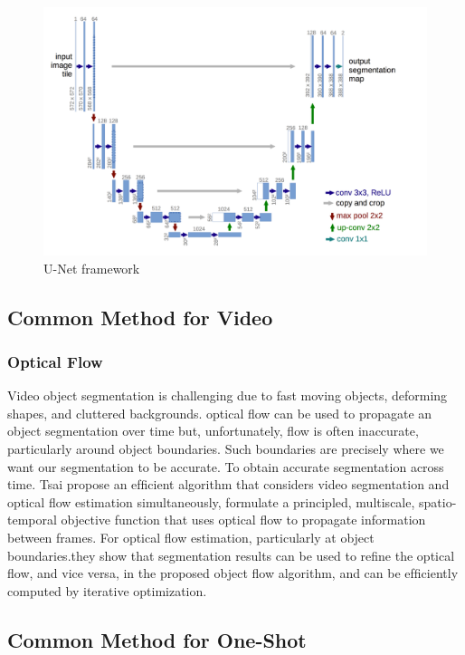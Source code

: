 \begin{figure}
    \begin{center}
        \includegraphics[width=\textwidth]{figure/unet.png}
    \end{center}
    \caption{U-Net framework}
    \label{unet}
\end{figure}
\subsection{Common Method for Video}

\subsubsection{Optical Flow}
Video object segmentation is challenging due to fast moving objects, deforming shapes, and cluttered backgrounds. optical flow can be used to propagate an object segmentation over time but, unfortunately, flow is often inaccurate, particularly around object boundaries. Such boundaries are precisely where we want our segmentation to be accurate. To obtain accurate segmentation across time.  Tsai \etal propose an efﬁcient algorithm\cite{OFL}  that considers video segmentation and optical ﬂow estimation simultaneously, formulate a principled, multiscale, spatio-temporal objective function that uses optical ﬂow to propagate information between frames. For optical ﬂow estimation, particularly at object boundaries.they show that segmentation results can be used to reﬁne the optical ﬂow, and vice versa, in the proposed object ﬂow algorithm, and can be efﬁciently computed by iterative optimization.


\subsection{Common Method for One-Shot}

